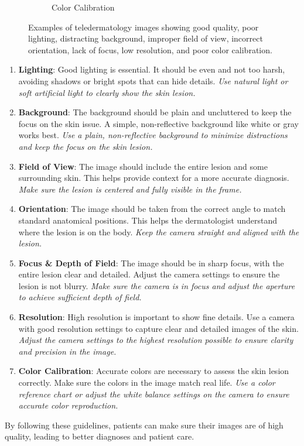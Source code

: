 \begin{figure}[ht]
\begin{subfigure}[b]{0.24\textwidth}
        \caption{Color Calibration}
        \label{fig:cc}
    \end{subfigure}
    \caption{Examples of teledermatology images showing good quality, poor lighting, distracting background, improper field of view, incorrect orientation, lack of focus, low resolution, and poor color calibration.}
    \label{fig:quality_criteria}
\end{figure}
\begin{enumerate}
    \item \textbf{Lighting}:  Good lighting is essential. It should be even and not too harsh, avoiding shadows or bright spots that can hide details. \textit{Use natural light or soft artificial light to clearly show the skin lesion.}
    \item \textbf{Background}:  The background should be plain and uncluttered to keep the focus on the skin issue. A simple, non-reflective background like white or gray works best. \textit{Use a plain, non-reflective background to minimize distractions and keep the focus on the skin lesion.}
    \item \textbf{Field of View}: The image should include the entire lesion and some surrounding skin. This helps provide context for a more accurate diagnosis. \textit{Make sure the lesion is centered and fully visible in the frame.}
    \item \textbf{Orientation}: The image should be taken from the correct angle to match standard anatomical positions. This helps the dermatologist understand where the lesion is on the body. \textit{Keep the camera straight and aligned with the lesion.}
    \item \textbf{Focus \& Depth of Field}: The image should be in sharp focus, with the entire lesion clear and detailed. Adjust the camera settings to ensure the lesion is not blurry. \textit{Make sure the camera is in focus and adjust the aperture to achieve sufficient depth of field.}
    \item \textbf{Resolution}: High resolution is important to show fine details. Use a camera with good resolution settings to capture clear and detailed images of the skin. \textit{Adjust the camera settings to the highest resolution possible to ensure clarity and precision in the image.}
    \item \textbf{Color Calibration}:  Accurate colors are necessary to assess the skin lesion correctly. Make sure the colors in the image match real life. \textit{Use a color reference chart or adjust the white balance settings on the camera to ensure accurate color reproduction.}
\end{enumerate}
By following these guidelines, patients can make sure their images are of high quality, leading to better diagnoses and patient care. \par


